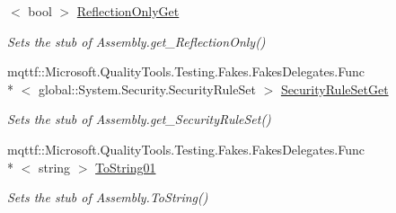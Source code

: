 \begin{DoxyCompactItemize}
$<$ bool $>$ \hyperlink{class_system_1_1_reflection_1_1_fakes_1_1_stub_assembly_a4cb2a533cbe9593334245bb2f478eba7}{Reflection\-Only\-Get}
\begin{DoxyCompactList}\small\item\em Sets the stub of Assembly.\-get\-\_\-\-Reflection\-Only()\end{DoxyCompactList}\item 
mqttf\-::\-Microsoft.\-Quality\-Tools.\-Testing.\-Fakes.\-Fakes\-Delegates.\-Func\\*
$<$ global\-::\-System.\-Security.\-Security\-Rule\-Set $>$ \hyperlink{class_system_1_1_reflection_1_1_fakes_1_1_stub_assembly_a2ffb7f73debeaef0776897b4dc59c842}{Security\-Rule\-Set\-Get}
\begin{DoxyCompactList}\small\item\em Sets the stub of Assembly.\-get\-\_\-\-Security\-Rule\-Set()\end{DoxyCompactList}\item 
mqttf\-::\-Microsoft.\-Quality\-Tools.\-Testing.\-Fakes.\-Fakes\-Delegates.\-Func\\*
$<$ string $>$ \hyperlink{class_system_1_1_reflection_1_1_fakes_1_1_stub_assembly_a039c6c36a8b23cad2e4f55b607a17267}{To\-String01}
\begin{DoxyCompactList}\small\item\em Sets the stub of Assembly.\-To\-String()\end{DoxyCompactList}\end{DoxyCompactItemize}
